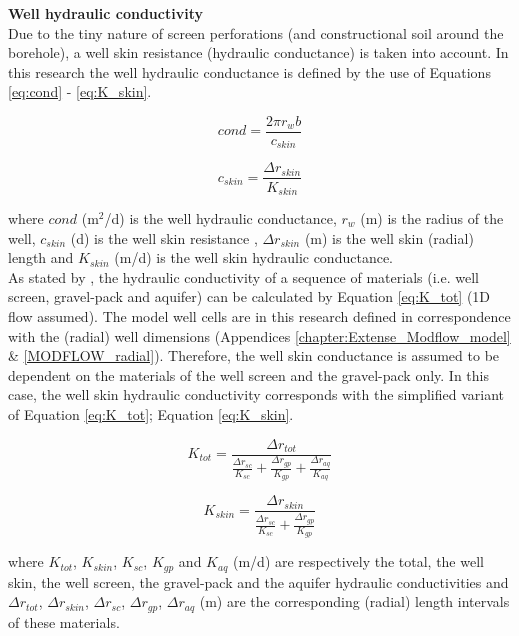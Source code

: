\textbf{Well hydraulic conductivity} \\
Due to the tiny nature of screen perforations (and constructional soil around the borehole), a well skin resistance (hydraulic conductance) is taken into account. In this research the well hydraulic conductance is defined by the use of Equations \ref{eq:cond} - \ref{eq:K_skin}. 

\begin{equation}
 cond = \frac{2\pi r_w b}{c_{skin}}
\label{eq:cond}
\end{equation}

\begin{equation}
 c_{skin} = \frac{\Delta r_{skin}}{K_{skin}}
\label{eq:c_skin}
\end{equation}

where $cond$ (m$^2$/d) is the well hydraulic conductance, $r_w$ (m) is the radius of the well, $c_{skin}$ (d) is the well skin resistance , $\Delta r_{skin}$ (m) is the well skin (radial) length and $K_{skin}$ (m/d) is the well skin hydraulic conductance. \\

As stated by \citet{Houben2015}, the hydraulic conductivity of a sequence of materials (i.e. well screen, gravel-pack and aquifer) can be calculated by Equation \ref{eq:K_tot} (1D flow assumed). The model well cells are in this research defined in correspondence with the (radial) well dimensions (Appendices \ref{chapter:Extense_Modflow_model} \& \ref{MODFLOW_radial}). Therefore, the well skin conductance is assumed to be dependent on the materials of the well screen and the gravel-pack only. In this case, the well skin hydraulic conductivity corresponds with the simplified variant of Equation \ref{eq:K_tot}; Equation \ref{eq:K_skin}.  

\begin{equation}
 K_{tot} = \frac{\Delta r_{tot}}{\frac{\Delta r_{sc}}{K_{sc}} + \frac{\Delta r_{gp}}{K_{gp}} + \frac{\Delta r_{aq}}{K_{aq}}}
\label{eq:K_tot}
\end{equation}

\begin{equation}
 K_{skin} = \frac{\Delta r_{skin}}{\frac{\Delta r_{sc}}{K_{sc}} + \frac{\Delta r_{gp}}{K_{gp}}}
\label{eq:K_skin}
\end{equation}

where $K_{tot}$, $K_{skin}$, $K_{sc}$, $K_{gp}$ and $K_{aq}$ (m/d) are respectively the total, the well skin, the well screen, the gravel-pack and the aquifer hydraulic conductivities and ${\Delta r_{tot}}$, ${\Delta r_{skin}}$, ${\Delta r_{sc}}$, ${\Delta r_{gp}}$, ${\Delta r_{aq}}$ (m) are the corresponding (radial) length intervals of these materials. \\

